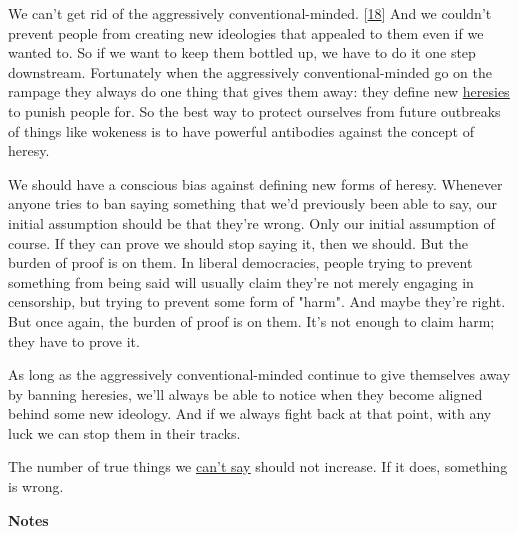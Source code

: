We can't get rid of the
                  aggressively conventional-minded.
                  [\href{\#f18n}{18}]
                  And we couldn't prevent people from creating new ideologies
                  that appealed to them even if we wanted to. So if we want to
                  keep them bottled up, we have to do it one step downstream.
                  Fortunately when the aggressively conventional-minded go on
                  the rampage they always do one thing that gives them away:
                  they define new \href{http://www.paulgraham.com/heresy.html}{\underline{heresies}} to
                  punish people for. So the best way to protect ourselves from
                  future outbreaks of things like wokeness is to have powerful
                  antibodies against the concept of heresy.

We should
                  have a conscious bias against defining new forms of heresy.
                  Whenever anyone tries to ban saying something that we'd
                  previously been able to say, our initial assumption should be
                  that they're wrong. Only our initial assumption of course. If
                  they can prove we should stop saying it, then we should. But
                  the burden of proof is on them. In liberal democracies, people
                  trying to prevent something from being said will usually claim
                  they're not merely engaging in censorship, but trying to
                  prevent some form of "harm". And maybe they're right. But once
                  again, the burden of proof is on them. It's not enough to
                  claim harm; they have to prove it.

As long as the
                  aggressively conventional-minded continue to give themselves
                  away by banning heresies, we'll always be able to notice when
                  they become aligned behind some new ideology. And if we always
                  fight back at that point, with any luck we can stop them in
                  their tracks.

The number of true things we
                  \href{http://www.paulgraham.com/say.html}{\underline{can't say}} should not increase.
                  If it does, something is wrong.









\textbf{Notes}

